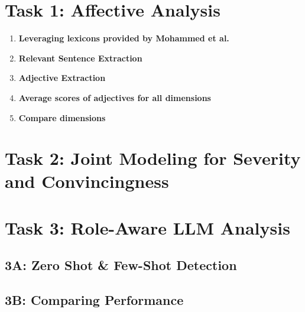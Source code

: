 \documentclass[12pt]{article}
\begin{document}
\maketitlepage

\section*{Task 1: Affective Analysis}

\begin{enumerate}
    \item \textbf{Leveraging lexicons provided by Mohammed et al.}
    \item \textbf{Relevant Sentence Extraction}
    \item \textbf{Adjective Extraction}
    \item \textbf{Average scores of adjectives for all dimensions}
    \item \textbf{Compare dimensions}
\end{enumerate}

\section*{Task 2: Joint Modeling for Severity and Convincingness}

\section*{Task 3: Role-Aware LLM Analysis}

\subsection*{3A: Zero Shot \& Few-Shot Detection}

\subsection*{3B: Comparing Performance}
\end{document}
